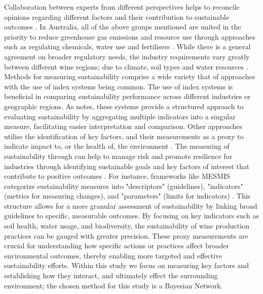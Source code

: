 Collaboration between experts from different perspectives helps to reconcile opinions regarding different factors and their contribution to sustainable outcomes \citep{dichiaraCollaborativeApproachAchieving2024}. In Australia, all of the above groups mentioned are united in the priority to reduce greenhouse gas emissions and resource use through approaches such as regulating chemicals, water use and fertilisers \citep{dumbrellComparingAustralianPublic2024}. While there is a general agreement on broader regulatory needs, the industry requirements vary greatly between different wine regions; due to climate, soil types and water resources \citep{abbalDecisionSupportSystem2016,agostaRegionalClimateVariability2012}.
% 
Methods for measuring sustainability comprise a wide variety that of approaches with the use of index systems being common. The use of index systems is beneficial in comparing sustainability performance across different industries or geographic regions. As \textcite{gehringerMappingSustainabilityMeasurement2024} notes, these systems provide a structured approach to evaluating sustainability by aggregating multiple indicators into a singular measure, facilitating easier interpretation and comparison.
Other approaches utilise the identification of key factors, and their measurements as a proxy to indicate impact to, or the health of, the environment \citep{floresWhatSustainabilityWine2018}. The measuring of sustainability through can help to manage risk and promote resilience for industries through identifying sustainable goals and key factors of interest that contribute to positive outcomes \citep{klemesAssessingMeasuringEnvironmental2015, beckerSustainabilityScienceManaging2024}. For instance, frameworks like MESMIS categorize sustainability measures into "descriptors" (guidelines), "indicators" (metrics for measuring changes), and "parameters" (limits for indicators) \citep{candido_sustainability_2015}. This structure allows for a more granular assessment of sustainability by linking broad guidelines to specific, measurable outcomes. By focusing on key indicators such as soil health, water usage, and biodiversity, the sustainability of wine production practices can be gauged with greater precision. These proxy measurements are crucial for understanding how specific actions or practices affect broader environmental outcomes, thereby enabling more targeted and effective sustainability efforts. Within this study we focus on measuring key factors and establishing how they interact, and ultimately effect the surrounding environment; the chosen method for this study is a Bayesian Network.
